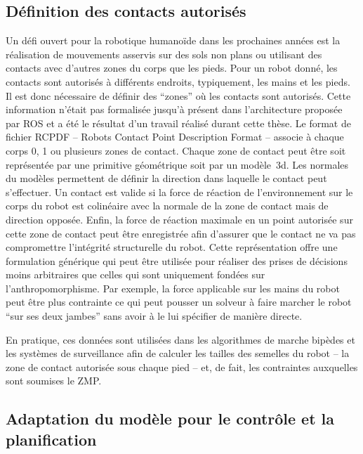 \subsection{Définition des contacts autorisés}

Un défi ouvert pour la robotique humanoïde dans les prochaines années
est la réalisation de mouvements asservis sur des sols non plans ou
utilisant des contacts avec d'autres zones du corps que les
pieds. Pour un robot donné, les contacts sont autorisés à différents
endroits, typiquement, les mains et les pieds. Il est donc nécessaire
de définir des ``zones'' où les contacts sont autorisés. Cette
information n'était pas formalisée jusqu'à présent dans l'architecture
proposée par ROS et a été le résultat d'un travail réalisé durant
cette thèse. Le format de fichier RCPDF -- Robots Contact Point
Description Format -- associe à chaque corps 0, 1 ou plusieurs zones de
contact. Chaque zone de contact peut être soit représentée par une
primitive géométrique soit par un modèle 3d. Les normales du modèles
permettent de définir la direction dans laquelle le contact peut
s'effectuer. Un contact est valide si la force de réaction de
l'environnement sur le corps du robot est colinéaire avec la normale
de la zone de contact mais de direction opposée. Enfin, la force de
réaction maximale en un point autorisée sur cette zone de contact peut
être enregistrée afin d'assurer que le contact ne va pas compromettre
l'intégrité structurelle du robot. Cette représentation offre une
formulation générique qui peut être utilisée pour réaliser des prises
de décisions moins arbitraires que celles qui sont uniquement fondées
sur l'anthropomorphisme. Par exemple, la force applicable sur les
mains du robot peut être plus contrainte ce qui peut pousser un
solveur à faire marcher le robot ``sur ses deux jambes'' sans avoir à
le lui spécifier de manière directe.

En pratique, ces données sont utilisées dans les algorithmes de marche
bipèdes et les systèmes de surveillance afin de calculer les tailles
des semelles du robot -- la zone de contact autorisée sous chaque pied
-- et, de fait, les contraintes auxquelles sont soumises le ZMP.


\subsection{Adaptation du modèle pour le contrôle et la planification}

